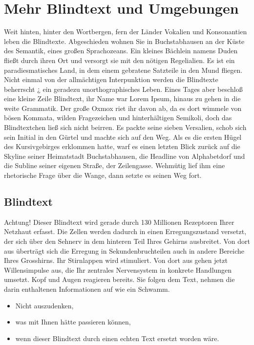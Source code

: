 \documentclass[a4paper,parskip=half,oneside]{scrbook}
\begin{document}
\chapter{Mehr Blindtext und Umgebungen}
Weit hinten, hinter den Wortbergen, fern der Länder Vokalien und Konsonantien leben die Blindtexte. Abgeschieden wohnen Sie in Buchstabhausen an der Küste des Semantik, eines großen Sprachozeans. Ein kleines Bächlein namens Duden fließt durch ihren Ort und versorgt sie mit den nötigen Regelialien. Es ist ein paradiesmatisches Land, in dem einem gebratene Satzteile in den Mund fliegen. Nicht einmal von der allmächtigen Interpunktion werden die Blindtexte beherrscht ¿ ein geradezu unorthographisches Leben. Eines Tages aber beschloß eine kleine Zeile Blindtext, ihr Name war Lorem Ipsum, hinaus zu gehen in die weite Grammatik. Der große Oxmox riet ihr davon ab, da es dort wimmele von bösen Kommata, wilden Fragezeichen und hinterhältigen Semikoli, doch das Blindtextchen ließ sich nicht beirren. Es packte seine sieben Versalien, schob sich sein Initial in den Gürtel und machte sich auf den Weg. Als es die ersten Hügel des Kursivgebirges erklommen hatte, warf es einen letzten Blick zurück auf die Skyline seiner Heimatstadt Buchstabhausen, die Headline von Alphabetdorf und die Subline seiner eigenen Straße, der Zeilengasse. Wehmütig lief ihm eine rhetorische Frage über die Wange, dann setzte es seinen Weg fort. 

\section{Blindtext}
Achtung! Dieser Blindtext wird gerade durch 130 Millionen Rezeptoren Ihrer Netzhaut erfasst. Die Zellen werden dadurch in einen Erregungszustand versetzt, der sich über den Sehnerv in dem hinteren Teil Ihres Gehirns ausbreitet. Von dort aus überträgt sich die Erregung in Sekundenbruchteilen auch in andere Bereiche Ihres Grosshirns. Ihr Stirnlappen wird stimuliert. Von dort aus gehen jetzt Willensimpulse aus, die Ihr zentrales Nervensystem in konkrete Handlungen umsetzt. Kopf und Augen reagieren bereits. Sie folgen dem Text, nehmen die darin enthaltenen Informationen auf wie ein Schwamm.

\begin{itemize}
  \item Nicht auszudenken,
  \item was mit Ihnen hätte passieren können,
  \item wenn dieser Blindtext durch einen echten Text ersetzt worden wäre.
\end{itemize}
\end{document}
